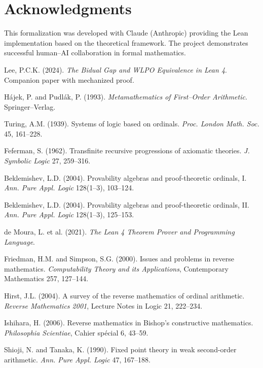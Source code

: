 \documentclass[11pt]{article}
\theoremstyle{definition}
\theoremstyle{remark}
\begin{document}
\section*{Acknowledgments}

This formalization was developed with Claude (Anthropic) providing the Lean implementation based on the theoretical framework. The project demonstrates successful human--AI collaboration in formal mathematics.

\begin{thebibliography}{10}

Lee, P.C.K. (2024). \emph{The Bidual Gap and WLPO Equivalence in Lean 4}. Companion paper with mechanized proof.

Hájek, P. and Pudlák, P. (1993). \emph{Metamathematics of First--Order Arithmetic}. Springer--Verlag.

Turing, A.M. (1939). Systems of logic based on ordinals. \emph{Proc. London Math. Soc.} 45, 161--228.

Feferman, S. (1962). Transfinite recursive progressions of axiomatic theories. \emph{J. Symbolic Logic} 27, 259--316.

Beklemishev, L.D. (2004). Provability algebras and proof-theoretic ordinals, {I}. \emph{Ann. Pure Appl. Logic} 128(1--3), 103--124.

Beklemishev, L.D. (2004). Provability algebras and proof-theoretic ordinals, {II}. \emph{Ann. Pure Appl. Logic} 128(1--3), 125--153.

de Moura, L. et al. (2021). \emph{The Lean 4 Theorem Prover and Programming Language}. 

Friedman, H.M. and Simpson, S.G. (2000). Issues and problems in reverse mathematics. \emph{Computability Theory and its Applications}, Contemporary Mathematics 257, 127--144.

Hirst, J.L. (2004). A survey of the reverse mathematics of ordinal arithmetic. \emph{Reverse Mathematics 2001}, Lecture Notes in Logic 21, 222--234.

Ishihara, H. (2006). Reverse mathematics in Bishop's constructive mathematics. \emph{Philosophia Scientiae}, Cahier spécial 6, 43--59.

Shioji, N. and Tanaka, K. (1990). Fixed point theory in weak second-order arithmetic. \emph{Ann. Pure Appl. Logic} 47, 167--188.

\end{thebibliography}
\end{document}
